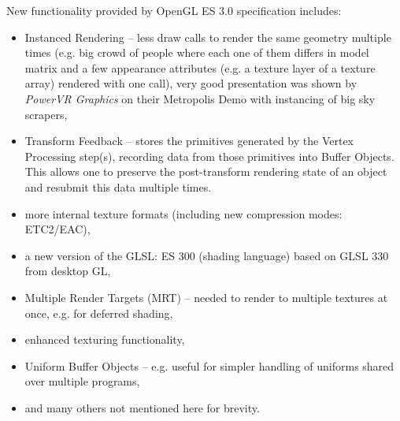 New functionality provided by OpenGL ES 3.0 specification includes:
\begin{itemize}
\item Instanced Rendering – less draw calls to render the same geometry multiple times (e.g. big crowd of people where each one of them differs in model matrix and a few appearance attributes (e.g. a texture layer of a texture array) rendered with one call), very good presentation was shown by \emph{PowerVR Graphics} \cite{powervr_graphics} on their Metropolis Demo \cite{powervr_metropolis} with instancing of big sky scrapers,
\item Transform Feedback – stores the primitives generated by the Vertex Processing step(s), recording data from those primitives into Buffer Objects.
This allows one to preserve the post-transform rendering state of an object and resubmit this data multiple times.
\item more internal texture formats (including new compression modes: ETC2/EAC),
\item a new version of the GLSL: ES 300 (shading language) based on GLSL 330 from desktop GL,
\item Multiple Render Targets (MRT) – needed to render to multiple textures at once, e.g. for deferred shading,
\item enhanced texturing functionality,
\item Uniform Buffer Objects – e.g. useful for simpler handling of uniforms shared over multiple programs,
\item and many others not mentioned here for brevity.
\end{itemize}